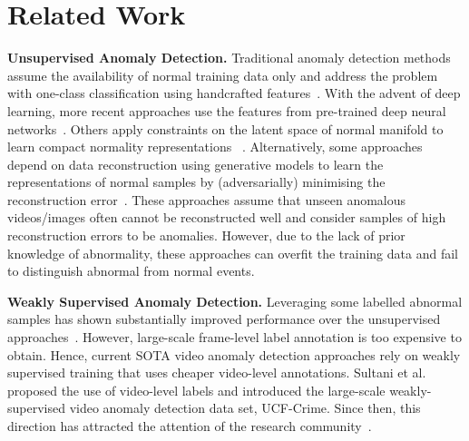 \documentclass[final]{cvpr}
\begin{document}
  




\section{Related Work}

\textbf{Unsupervised Anomaly Detection.} Traditional anomaly detection methods assume the availability of normal training data only and address the problem with one-class classification using handcrafted features~\cite{medioni2001event,basharat2008learning,wang2014learning,zhang2009learning}. 
With the advent of deep learning, more recent approaches use the features from pre-trained deep neural networks~\cite{zhao2020exploring,smeureanu2017deep,pang2020self,tudor2017unmasking}. Others apply constraints on the latent space of normal manifold to learn compact normality representations
~\cite{Markovitz_2020_CVPR,Bergmann_2020_CVPR,Park_2020_CVPR,Bergmann_2019_CVPR,Morais_2019_CVPR,Abati_2019_CVPR,Perera_2019_CVPR,bergman2020classification,zhou2020encoding,Sabokrou_2018_CVPR,ruff2018deep,golan2018deep,wang2019gods,del2016discriminative,Cheng_2015_CVPR}. 
Alternatively, some approaches depend on data reconstruction using generative models to learn the representations of normal samples by (adversarially) minimising the reconstruction error~\cite{liu2018future,ren2015unsupervised,xu2015learning,ionescu2019object,gong2019memorizing,nguyen2019anomaly,sabokrou2017deep,Sabokrou_2018_CVPR,morais2019learning,ionescu2019object,Park_2020_CVPR,Burlina_2019_CVPR,venkataramanan2019attention,zong2018deep,Nguyen_2019_ICCV,nguyen2019anomaly}. These approaches assume that unseen anomalous videos/images often cannot be reconstructed well and consider samples of high reconstruction errors to be anomalies.
However, due to the lack of prior knowledge of abnormality, these approaches can overfit the training data and fail to distinguish abnormal from normal events.



\textbf{Weakly Supervised Anomaly Detection.} Leveraging some labelled abnormal samples has shown substantially improved performance over the unsupervised approaches~\cite{tian2020few,sultani2018real,Wu2020not,liu2019margin,ruff2019deep,pang2019deep,pang2018learning}.
However, large-scale frame-level label annotation is too expensive to obtain. Hence, current SOTA video anomaly detection approaches rely on weakly supervised training that uses cheaper video-level annotations. Sultani et al.~\cite{sultani2018real} proposed the use of video-level labels and introduced the large-scale weakly-supervised video anomaly detection data set, UCF-Crime. 
Since then, this direction has attracted the attention of the research community~\cite{8803657,9102722,Wu2020not}. 
\end{document}

